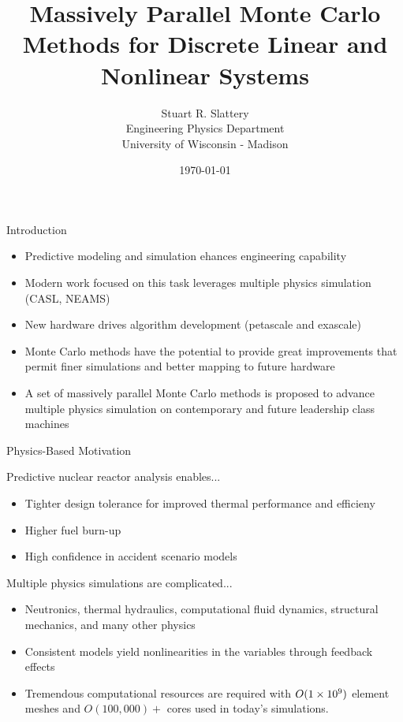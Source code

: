 \documentclass{beamer}
\author{Stuart R. Slattery
  \\ Engineering Physics Department
  \\ University of Wisconsin - Madison
}
\date{\today}
\title{Massively Parallel Monte Carlo Methods for Discrete Linear and
  Nonlinear Systems}
\begin{document}
\maketitle

\begin{frame}{Introduction}

  \begin{itemize}
    \item Predictive modeling and simulation ehances engineering
      capability
    \item Modern work focused on this task leverages multiple physics
      simulation (CASL, NEAMS)
    \item New hardware drives algorithm development (petascale and
      exascale)
    \item Monte Carlo methods have the potential to provide great
      improvements that permit finer simulations and better mapping to
      future hardware
    \item A set of massively parallel Monte Carlo methods is proposed
      to advance multiple physics simulation on contemporary and
      future leadership class machines
  \end{itemize}

\end{frame}

\begin{frame}{Physics-Based Motivation}
 
  \begin{beamerboxesrounded}[upper=boxheadcolor,lower=boxbodycolor,shadow=true]
    {Predictive nuclear reactor analysis enables...}
    \begin{itemize}
    \item Tighter design tolerance for improved thermal performance
      and efficieny
    \item Higher fuel burn-up
    \item High confidence in accident scenario models
    \end{itemize}
  \end{beamerboxesrounded}

  \pause 
  \begin{beamerboxesrounded}[upper=boxheadcolor,lower=boxbodycolor,shadow=true]
  {Multiple physics simulations are complicated...}
    \begin{itemize}
    \item Neutronics, thermal hydraulics, computational fluid
      dynamics, structural mechanics, and many other physics
    \item Consistent models yield nonlinearities in the variables
      through feedback effects
    \item Tremendous computational resources are required with
      $O(1\times 10^{9})$ element meshes and $O(100,000)+$ cores used in
      today's simulations.
    \end{itemize}
  \end{beamerboxesrounded}

\end{frame}
\end{document}
